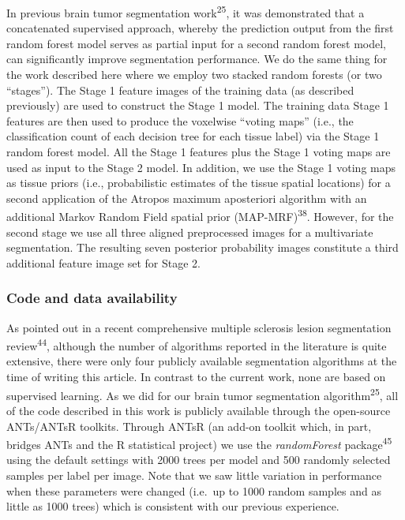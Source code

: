 \documentclass[11pt,]{article}
\begin{document}
In previous brain tumor segmentation work\textsuperscript{25}, it was
demonstrated that a concatenated supervised approach, whereby the
prediction output from the first random forest model serves as partial
input for a second random forest model, can significantly improve
segmentation performance. We do the same thing for the work described
here where we employ two stacked random forests (or two ``stages''). The
Stage 1 feature images of the training data (as described previously)
are used to construct the Stage 1 model. The training data Stage 1
features are then used to produce the voxelwise ``voting maps'' (i.e.,
the classification count of each decision tree for each tissue label)
via the Stage 1 random forest model. All the Stage 1 features plus the
Stage 1 voting maps are used as input to the Stage 2 model. In addition,
we use the Stage 1 voting maps as tissue priors (i.e., probabilistic
estimates of the tissue spatial locations) for a second application of
the Atropos maximum aposteriori algorithm with an additional Markov
Random Field spatial prior (MAP-MRF)\textsuperscript{38}. However, for
the second stage we use all three aligned preprocessed images for a
multivariate segmentation. The resulting seven posterior probability
images constitute a third additional feature image set for Stage 2.

\subsubsection{Code and data
availability}\label{code-and-data-availability}

As pointed out in a recent comprehensive multiple sclerosis lesion
segmentation review\textsuperscript{44}, although the number of
algorithms reported in the literature is quite extensive, there were
only four publicly available segmentation algorithms at the time of
writing this article. In contrast to the current work, none are based on
supervised learning. As we did for our brain tumor segmentation
algorithm\textsuperscript{25}, all of the code described in this work is
publicly available through the open-source ANTs/ANTsR toolkits. Through
ANTsR (an add-on toolkit which, in part, bridges ANTs and the R
statistical project) we use the \emph{randomForest}
package\textsuperscript{45} using the default settings with 2000 trees
per model and 500 randomly selected samples per label per image. Note
that we saw little variation in performance when these parameters were
changed (i.e.~up to 1000 random samples and as little as 1000 trees)
which is consistent with our previous experience.
\end{document}
